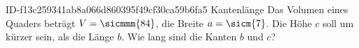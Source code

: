 \begin{exercise}
      {ID-f13c259341ab8a066d860395f49cf30ca59b6fa5}
      {Kantenlänge}
  \ifproblem\problem
    Das Volumen eines Quaders beträgt $V=\sicmmm{84}$, die Breite
    $a=\sicm{7}$. Die Höhe $c$ soll um  kürzer sein, als die Länge $b$.
    Wie lang sind die Kanten $b$ und $c$?
  \fi
\end{exercise}
